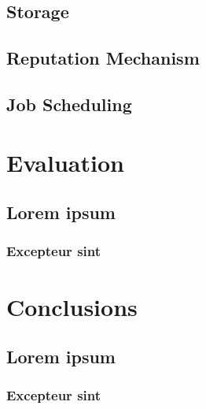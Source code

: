 \documentclass{./llncs2e/llncs}
\begin{document}
\subsection{Storage}

\subsection{Reputation Mechanism}

\subsection{Job Scheduling}




% 
% 

\section{Evaluation}

\subsection{Lorem ipsum}

\subsubsection{Excepteur sint}



% 
% 

\section{Conclusions}

\subsection{Lorem ipsum}

\subsubsection{Excepteur sint}
\end{document}
